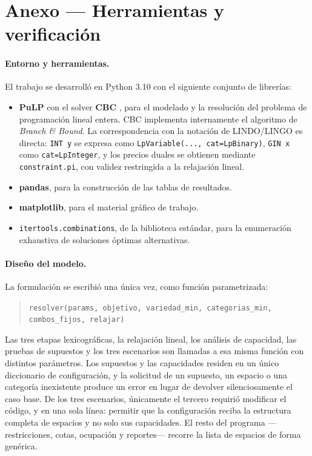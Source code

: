 \documentclass[10pt,a4paper]{article}
\begin{document}
\section*{Anexo — Herramientas y verificación}

\paragraph{Entorno y herramientas.} El trabajo se desarrolló en Python 3.10 con
el siguiente conjunto de librerías:

\begin{itemize}
  \item \textbf{PuLP} \cite{pulp} con el solver \textbf{CBC} \cite{cbc}, para el
  modelado y la resolución del problema de programación lineal entera. CBC
  implementa internamente el algoritmo de \emph{Branch \& Bound}. La
  correspondencia con la notación de LINDO/LINGO es directa: \texttt{INT y} se
  expresa como \texttt{LpVariable(..., cat=LpBinary)}, \texttt{GIN x} como
  \texttt{cat=LpInteger}, y los precios duales se obtienen mediante
  \texttt{constraint.pi}, con validez restringida a la relajación lineal.
  \item \textbf{pandas}, para la construcción de las tablas de resultados.
  \item \textbf{matplotlib}, para el material gráfico de trabajo.
  \item \texttt{itertools.combinations}, de la biblioteca estándar, para la
  enumeración exhaustiva de soluciones óptimas alternativas.
\end{itemize}

\paragraph{Diseño del modelo.} La formulación se escribió una única vez, como
función parametrizada:
\begin{quote}
\centering\small
\texttt{resolver(params, objetivo, variedad\_min, categorias\_min, combos\_fijos, relajar)}
\end{quote}
Las tres etapas lexicográficas, la relajación lineal, los análisis de capacidad,
las pruebas de supuestos y los tres escenarios son llamadas a esa misma función
con distintos parámetros. Los supuestos y las capacidades residen en un único
diccionario de configuración, y la solicitud de un supuesto, un espacio o una
categoría inexistente produce un error en lugar de devolver silenciosamente el
caso base. De los tres escenarios, únicamente el tercero requirió modificar el
código, y en una sola línea: permitir que la configuración reciba la estructura
completa de espacios y no solo sus capacidades. El resto del programa
—restricciones, cotas, ocupación y reportes— recorre la lista de espacios de
forma genérica.
\end{document}
